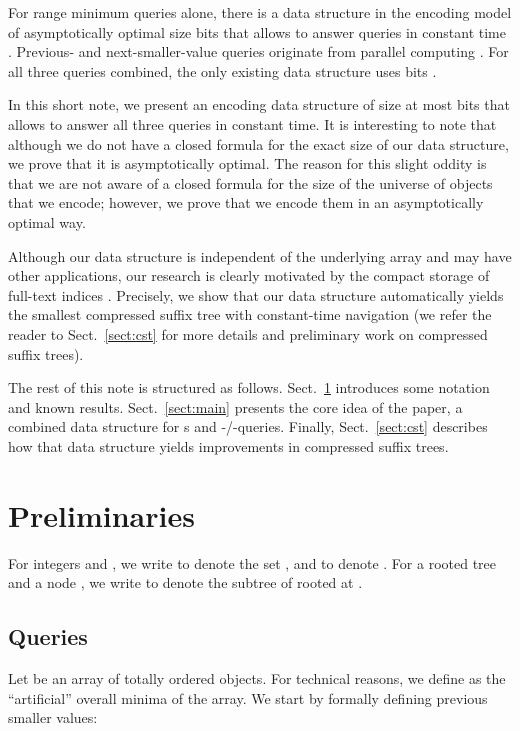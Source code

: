 \documentclass[11pt,onecolumn,final]{article} \usepackage{a4}
\theoremstyle{plain}
\theoremstyle{remark}
\begin{document}
For range minimum queries alone, there is a data structure in the encoding model of asymptotically optimal size  bits that allows to answer queries in constant time \cite{fischer10optimal}. Previous- and next-smaller-value queries originate from parallel computing \cite{berkman93optimal}. For all three queries combined, the only existing data structure uses  bits \cite{ohlebusch10cst++}.

In this short note, we present an encoding data structure of size at most  bits that allows to answer all three queries in constant time. It is interesting to note that although we do not have a closed formula for the exact size of our data structure, we prove that it is asymptotically optimal. The reason for this slight oddity is that we are not aware of a closed formula for the size  of the universe of objects that we encode; however, we prove that we encode them in an asymptotically optimal way.

Although our data structure is independent of the underlying array  and may have other applications, our research is clearly motivated by the compact storage of full-text indices \cite{navarro07compressed}. Precisely, we show that our data structure automatically yields the smallest compressed suffix tree with constant-time navigation (we refer the reader to Sect.~\ref{sect:cst} for more details and preliminary work on compressed suffix trees).

The rest of this note is structured as follows. Sect.~\ref{sect:preliminaries} introduces some notation and known results. Sect.~\ref{sect:main} presents the core idea of the paper, a combined data structure for s and -/-queries. Finally, Sect.~\ref{sect:cst} describes how that data structure yields improvements in compressed suffix trees.

\section{Preliminaries}
\label{sect:preliminaries}
For integers  and , we write  to denote the set , and  to denote . For a rooted tree  and a node , we write  to denote the subtree of  rooted at .

\subsection{Queries}
Let  be an array of totally ordered objects. For technical reasons, we define  as the ``artificial'' overall minima of the array. We start by formally defining previous smaller values:
\end{document}
